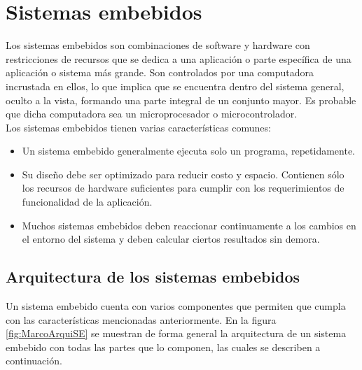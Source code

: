 \section{Sistemas embebidos}
	Los sistemas embebidos son combinaciones de software y hardware con restricciones de recursos que se dedica a una aplicación o parte específica de una aplicación o sistema más grande. Son controlados por una computadora incrustada en ellos, lo que implica que se encuentra dentro del sistema general, oculto a la vista, formando una parte integral de un conjunto mayor. Es probable que dicha computadora sea un microprocesador o microcontrolador.\\
	
	Los sistemas embebidos tienen varias características comunes:
	\begin{itemize}
		\item Un sistema embebido generalmente ejecuta solo un programa, repetidamente.
		\item Su diseño debe ser optimizado para reducir costo y espacio. Contienen sólo los recursos de hardware suficientes para cumplir con  los  requerimientos  de  funcionalidad  de  la  aplicación.
		\item Muchos sistemas embebidos deben reaccionar continuamente a los cambios en el entorno del sistema y deben calcular ciertos resultados sin demora.
	\end{itemize}
	
	
	\subsection{Arquitectura de los sistemas embebidos}
	Un sistema embebido cuenta con varios componentes que permiten que cumpla con las características mencionadas anteriormente. En la figura \ref{fig:MarcoArquiSE} se muestran de forma general la arquitectura de un sistema embebido con todas las partes que lo componen, las cuales se describen a continuación.
	
